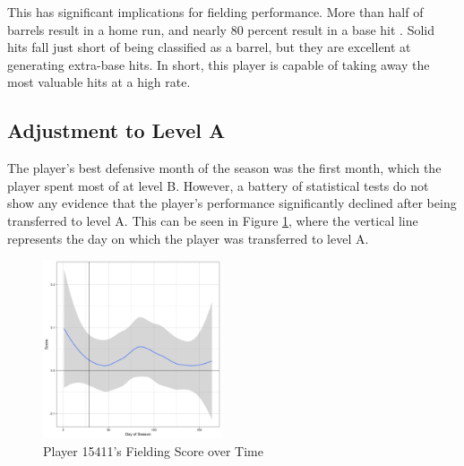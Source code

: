 This has significant implications for fielding performance. More than half of barrels result in a home run, and nearly 80 percent result in a base hit \cite{metzelaar}. Solid hits fall just short of being classified as a barrel, but they are excellent at generating extra-base hits. In short, this player is capable of taking away the most valuable hits at a high rate.

\subsection{Adjustment to Level A}
\label{sec:adjustment}

The player's best defensive month of the season was the first month, which the player spent most of at level B. However, a battery of statistical tests do not show any evidence that the player's performance significantly declined after being transferred to level A. This can be seen in Figure \ref{fig:scores}, where the vertical line represents the day on which the player was transferred to level A.

\begin{figure}[htb]
    \includegraphics[width = 0.47\textwidth]{../../output/figs/score_plot_15411.png}
    \caption{Player 15411's Fielding Score over Time}
    \label{fig:scores}
\end{figure}